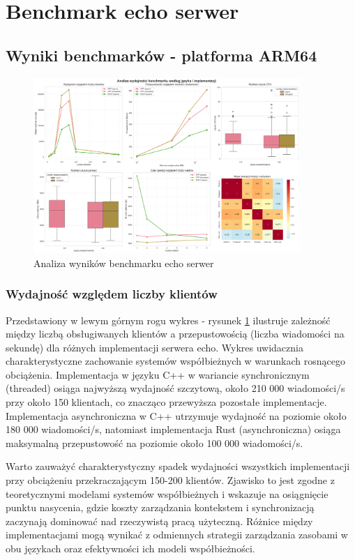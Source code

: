 \section{Benchmark echo serwer}

\subsection{Wyniki benchmarków - platforma ARM64}

\begin{figure}[H]
    \centering
    \includegraphics[width=0.9\textwidth]{analiza/images/conc/echo/arm/analiza_benchmarku.png}
    \caption{Analiza wyników benchmarku echo serwer}
    \label{analiza_benchmarku_echo_serwer}
\end{figure}
\subsubsection{Wydajność względem liczby klientów}
Przedstawiony w lewym górnym rogu wykres - rysunek \ref{analiza_benchmarku_echo_serwer} ilustruje zależność między liczbą obsługiwanych klientów a przepustowością (liczba wiadomości na sekundę) dla różnych implementacji serwera echo. Wykres uwidacznia charakterystyczne zachowanie systemów współbieżnych w warunkach rosnącego obciążenia. Implementacja w języku C++ w wariancie synchronicznym (threaded) osiąga najwyższą wydajność szczytową, około 210 000 wiadomości/s przy około 150 klientach, co znacząco przewyższa pozostałe implementacje. Implementacja asynchroniczna w C++ utrzymuje wydajność na poziomie około 180 000 wiadomości/s, natomiast implementacja Rust (asynchroniczna) osiąga maksymalną przepustowość na poziomie około 100 000 wiadomości/s.

Warto zauważyć charakterystyczny spadek wydajności wszystkich implementacji przy obciążeniu przekraczającym 150-200 klientów. Zjawisko to jest zgodne z teoretycznymi modelami systemów współbieżnych i wskazuje na osiągnięcie punktu nasycenia, gdzie koszty zarządzania kontekstem i synchronizacją zaczynają dominować nad rzeczywistą pracą użyteczną. Różnice między implementacjami mogą wynikać z odmiennych strategii zarządzania zasobami w obu językach oraz efektywności ich modeli współbieżności.

